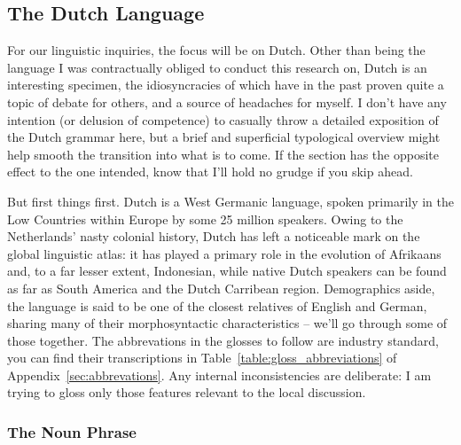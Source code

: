 \subsection{The Dutch Language}
For our linguistic inquiries, the focus will be on Dutch.
Other than being the language I was contractually obliged to conduct this research on, Dutch is an interesting specimen, the idiosyncracies of which have in the past proven quite a topic of debate for others, and a source of headaches for myself.
I don't have any intention (or delusion of competence) to casually throw a detailed exposition of the Dutch grammar here, but a brief and superficial typological overview might help smooth the transition into what is to come.
If the section has the opposite effect to the one intended, know that I'll hold no grudge if you skip ahead.

But first things first.
Dutch is a West Germanic language, spoken primarily in the Low Countries within Europe by some 25 million speakers.
Owing to the Netherlands' nasty colonial history, Dutch has left a noticeable mark on the global linguistic atlas: it has played a primary role in the evolution of Afrikaans and, to a far lesser extent, Indonesian, while native Dutch speakers can be found as far as South America and the Dutch Carribean region.
Demographics aside, the language is said to be one of the closest relatives of English and German, sharing many of their morphosyntactic characteristics -- we'll go through some of those together.
The abbrevations in the glosses to follow are industry standard, you can find their transcriptions in Table~\ref{table:gloss_abbreviations} of Appendix~\ref{sec:abbrevations}.
Any internal inconsistencies are deliberate: I am trying to gloss only those features relevant to the local discussion.

\subsubsection{The Noun Phrase}
